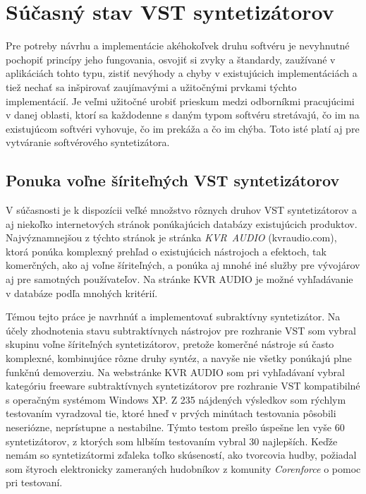 \chapter{Súčasný stav VST syntetizátorov}
\label{sucasnystav}

Pre potreby návrhu a implementácie akéhokoľvek druhu softvéru je nevyhnutné pochopiť princípy jeho fungovania, osvojiť si zvyky a štandardy, zaužívané v aplikáciách tohto typu, zistiť nevýhody a chyby v existujúcich implementáciách a tiež nechať sa inšpirovať zaujímavými a užitočnými prvkami týchto implementácií. Je veľmi užitočné urobiť prieskum medzi odborníkmi pracujúcimi v danej oblasti, ktorí sa každodenne s daným typom softvéru stretávajú, čo im na existujúcom softvéri vyhovuje, čo im prekáža a čo im chýba. Toto isté platí aj pre vytváranie softvérového syntetizátora.

\section{Ponuka voľne šíriteľných VST syntetizátorov}

V súčasnosti je k dispozícii veľké množstvo rôznych druhov VST syntetizátorov a aj niekoľko internetových stránok ponúkajúcich databázy existujúcich produktov. Najvýznamnejšou z týchto stránok je stránka \emph{KVR~AUDIO} (kvraudio.com), ktorá ponúka komplexný prehľad o existujúcich nástrojoch a efektoch, tak komerčných, ako aj voľne šíriteľných, a ponúka aj mnohé iné služby pre vývojárov aj pre samotných používateľov. Na stránke KVR AUDIO je možné vyhľadávanie v databáze podľa mnohých kritérií.

Témou tejto práce je navrhnúť a implementovať subraktívny syntetizátor. Na účely zhodnotenia stavu subtraktívnych nástrojov pre rozhranie VST som vybral skupinu voľne šíriteľných syntetizátorov, pretože komerčné nástroje sú často komplexné, kombinujúce rôzne druhy syntéz, a navyše nie všetky ponúkajú plne funkčnú demoverziu. Na webstránke KVR AUDIO som pri vyhľadávaní vybral kategóriu freeware subtraktívnych syntetizátorov pre rozhranie VST kompatibilné s operačným systémom Windows XP. Z 235 nájdených výsledkov som rýchlym testovaním vyradzoval tie, ktoré hneď v prvých minútach testovania pôsobili neseriózne, neprístupne a nestabilne. Týmto testom prešlo úspešne len vyše 60 syntetizátorov, z ktorých som hlbším testovaním vybral 30 najlepších. Keďže nemám so syntetizátormi zďaleka toľko skúseností, ako tvorcovia hudby, požiadal som štyroch elektronicky zameraných hudobníkov z komunity \emph{Corenforce} o pomoc pri testovaní.


